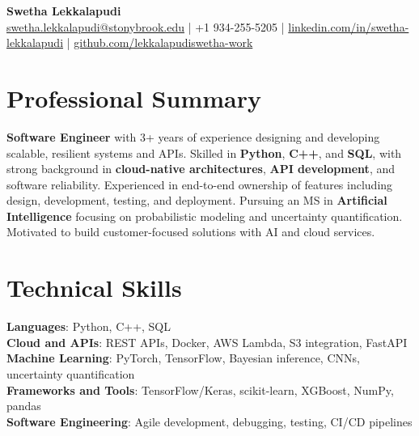 \documentclass[letterpaper,11pt]{article}
\begin{document}
\begin{center}
  {\Large \textbf{Swetha Lekkalapudi}} \\
  \href{mailto:swetha.lekkalapudi@stonybrook.edu}{swetha.lekkalapudi@stonybrook.edu} \enspace | \enspace +1 934-255-5205 \enspace | \enspace \href{https://www.linkedin.com/in/swetha-lekkalapudi/}{linkedin.com/in/swetha-lekkalapudi} \enspace | \enspace \href{https://github.com/lekkalapudiswetha-work}{github.com/lekkalapudiswetha-work}
\end{center}

\section{Professional Summary}
  \begin{itemize}[leftmargin=0.15in, label={}]
    \small{\item{
     \textbf{Software Engineer} with 3+ years of experience designing and developing scalable, resilient systems and APIs. Skilled in \textbf{Python}, \textbf{C++}, and \textbf{SQL}, with strong background in \textbf{cloud-native architectures}, \textbf{API development}, and software reliability. Experienced in end-to-end ownership of features including design, development, testing, and deployment. Pursuing an MS in \textbf{Artificial Intelligence} focusing on probabilistic modeling and uncertainty quantification. Motivated to build customer-focused solutions with AI and cloud services.
    }}
  \end{itemize}
\vspace{-16pt}

\section{Technical Skills}
 \begin{itemize}[leftmargin=0.15in, label={}]
    \small{\item{
     \textbf{Languages}: Python, C++, SQL \\
     \textbf{Cloud and APIs}: REST APIs, Docker, AWS Lambda, S3 integration, FastAPI \\
     \textbf{Machine Learning}: PyTorch, TensorFlow, Bayesian inference, CNNs, uncertainty quantification \\
     \textbf{Frameworks and Tools}: TensorFlow/Keras, scikit-learn, XGBoost, NumPy, pandas \\
     \textbf{Software Engineering}: Agile development, debugging, testing, CI/CD pipelines
    }}
 \end{itemize}
\vspace{-16pt}
\end{document}
